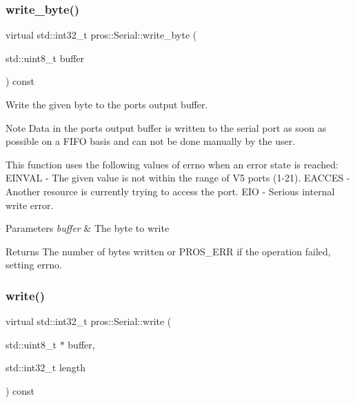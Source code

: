 \subsubsection{\texorpdfstring{write\+\_\+byte()}{write\_byte()}}
{\footnotesize\ttfamily virtual std\+::int32\+\_\+t pros\+::\+Serial\+::write\+\_\+byte (\begin{DoxyParamCaption}\item[{std\+::uint8\+\_\+t}]{buffer }\end{DoxyParamCaption}) const\hspace{0.3cm}{\ttfamily [virtual]}}



Write the given byte to the port\textquotesingle{}s output buffer. 

\begin{DoxyNote}{Note}
Data in the port\textquotesingle{}s output buffer is written to the serial port as soon as possible on a F\+I\+FO basis and can not be done manually by the user.
\end{DoxyNote}
This function uses the following values of errno when an error state is reached\+: E\+I\+N\+V\+AL -\/ The given value is not within the range of V5 ports (1-\/21). E\+A\+C\+C\+ES -\/ Another resource is currently trying to access the port. E\+IO -\/ Serious internal write error.


\begin{DoxyParams}{Parameters}
{\em buffer} & The byte to write\\
\hline
\end{DoxyParams}
\begin{DoxyReturn}{Returns}
The number of bytes written or P\+R\+O\+S\+\_\+\+E\+RR if the operation failed, setting errno. 
\end{DoxyReturn}
\mbox{\label{classpros_1_1Serial_a865313d3b482d9ffdd380edc36273b24}} 
\subsubsection{\texorpdfstring{write()}{write()}}
{\footnotesize\ttfamily virtual std\+::int32\+\_\+t pros\+::\+Serial\+::write (\begin{DoxyParamCaption}\item[{std\+::uint8\+\_\+t $\ast$}]{buffer,  }\item[{std\+::int32\+\_\+t}]{length }\end{DoxyParamCaption}) const\hspace{0.3cm}{\ttfamily [virtual]}}




